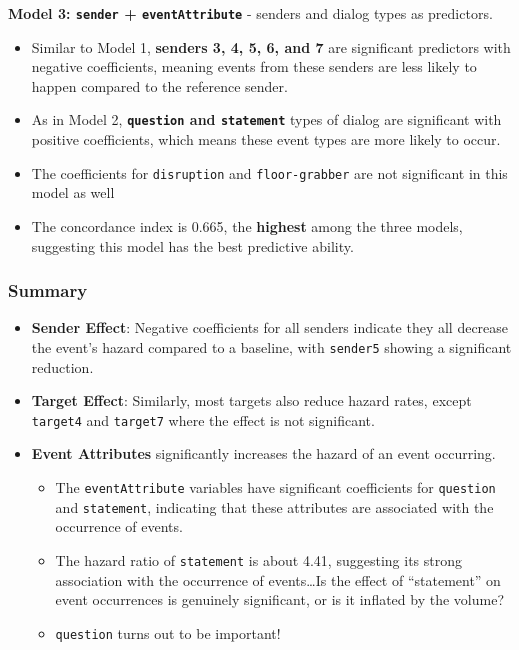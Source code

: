 \documentclass[
]{article}
\providecommand{\tightlist}{%
  \setlength{\itemsep}{0pt}\setlength{\parskip}{0pt}}
\begin{document}
\textbf{Model 3: \texttt{sender} + \texttt{eventAttribute}} - senders
and dialog types as predictors.

\begin{itemize}
\tightlist
\item
  Similar to Model 1, \textbf{senders 3, 4, 5, 6, and 7} are significant
  predictors with negative coefficients, meaning events from these
  senders are less likely to happen compared to the reference sender.
\item
  As in Model 2, \textbf{\texttt{question} and \texttt{statement}} types
  of dialog are significant with positive coefficients, which means
  these event types are more likely to occur.
\item
  The coefficients for \texttt{disruption} and \texttt{floor-grabber}
  are not significant in this model as well
\item
  The concordance index is 0.665, the \textbf{highest} among the three
  models, suggesting this model has the best predictive ability.
\end{itemize}

\hypertarget{summary}{%
\subsubsection{Summary}\label{summary}}

\begin{itemize}
\tightlist
\item
  \textbf{Sender Effect}: Negative coefficients for all senders indicate
  they all decrease the event's hazard compared to a baseline, with
  \texttt{sender5} showing a significant reduction.
\item
  \textbf{Target Effect}: Similarly, most targets also reduce hazard
  rates, except \texttt{target4} and \texttt{target7} where the effect
  is not significant.
\item
  \textbf{Event Attributes} significantly increases the hazard of an
  event occurring.

  \begin{itemize}
  \tightlist
  \item
    The \texttt{eventAttribute} variables have significant coefficients
    for \texttt{question} and \texttt{statement}, indicating that these
    attributes are associated with the occurrence of events.
  \item
    The hazard ratio of \texttt{statement} is about 4.41, suggesting its
    strong association with the occurrence of events\ldots Is the effect
    of ``statement'' on event occurrences is genuinely significant, or
    is it inflated by the volume?
  \item
    \texttt{question} turns out to be important!
  \end{itemize}
\end{itemize}
\end{document}
